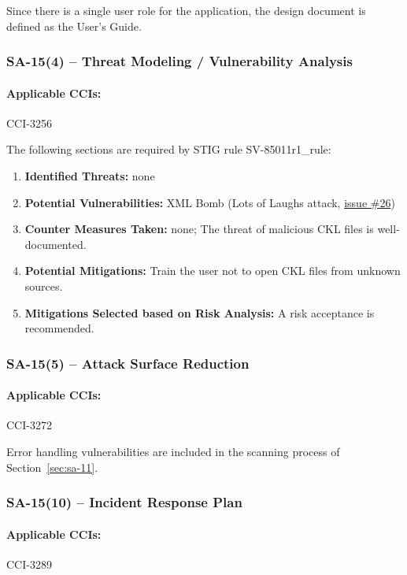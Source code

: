 \documentclass[letterpaper, 10pt, twoside]{article}
\begin{document}
Since there is a single user role for the application, the design document is defined as the User's Guide.

\subsubsection{SA-15(4) -- Threat Modeling / Vulnerability Analysis}

\paragraph{Applicable CCIs:} CCI-3256

The following sections are required by STIG rule SV-85011r1\_rule:
\begin{enumerate}
	\item \textbf{Identified Threats:} none
	\item \textbf{Potential Vulnerabilities:} XML Bomb (Lots of Laughs attack, \href{https://github.com/squinky86/STIGQter/issues/26}{issue \#26})
	\item \textbf{Counter Measures Taken:} none; The threat of malicious CKL files is well-documented.
	\item \textbf{Potential Mitigations:} Train the user not to open CKL files from unknown sources.
	\item \textbf{Mitigations Selected based on Risk Analysis:} A risk acceptance is recommended.
\end{enumerate}

\subsubsection{SA-15(5) -- Attack Surface Reduction}

\paragraph{Applicable CCIs:} CCI-3272

Error handling vulnerabilities are included in the scanning process of Section~\ref{sec:sa-11}.

\subsubsection{SA-15(10) -- Incident Response Plan}

\paragraph{Applicable CCIs:} CCI-3289
\end{document}

